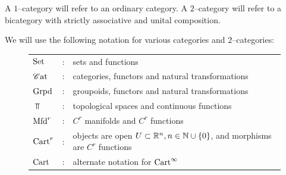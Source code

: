 \documentclass[11pt]{amsart}
\begin{document}
\begin{conv}
A $1$--category will refer to an ordinary category.
A $2$--category will refer to a bicategory with strictly associative and unital composition.
\end{conv}

\begin{notn}
We will use the following notation for various categories and $2$--categories:
\begin{figure}[H]
\begin{tabularx}{\textwidth}{l c l}
$\mathrm{Set}$ & : & sets and functions \\
$\mathscr{C}\mathrm{at}$ & : & categories, functors and natural transformations \\
$\mathrm{Grpd}$ & : & groupoids, functors and natural transformations \\
$\Top$ & : & topological spaces and continuous functions \\
$\mathrm{Mfd}^r$ & : & $C^r$ manifolds and $C^r$ functions \\
$\mathrm{Cart}^r$ & : & objects are open $U \subset \bR^n, n \in \bN \cup \set{0}$,
                and morphisms are $C^r$ functions \\
$\mathrm{Cart}$ & : & alternate notation for $\mathrm{Cart}^\infty$ \\
\end{tabularx}
\end{figure}
\end{notn}
\end{document}
